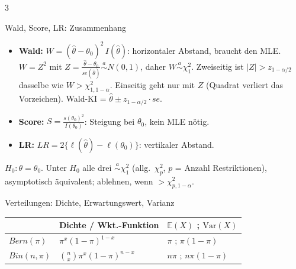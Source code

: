 \documentclass[8pt,a4paper,landscape]{extarticle}
\renewcommand{\arraystretch}{1.12}
\newcommand{\E}{\mathbb{E}}
\newcommand{\V}{\mathrm{Var}}
\newcommand{\asim}{\overset{a}{\sim}}
\begin{document}
\begin{multicols*}{3}
\begin{wissen}{Wald, Score, LR: Zusammenhang}
\begin{center}
\end{center}
\begin{itemize}
\item \textbf{Wald:} $W=(\hat\theta-\theta_0)^2\,I(\hat\theta)$: horizontaler Abstand, braucht den MLE. $W=Z^2$ mit $Z=\frac{\hat\theta-\theta_0}{se(\hat\theta)}\asim N(0,1)$, daher $W\asim\chi^2_1$. Zweiseitig ist $|Z|>z_{1-\alpha/2}$ dasselbe wie $W>\chi^2_{1,1-\alpha}$. Einseitig geht nur mit $Z$ (Quadrat verliert das Vorzeichen). Wald-KI = $\hat\theta\pm z_{1-\alpha/2}\cdot se$.
\item \textbf{Score:} $S=\frac{s(\theta_0)^2}{I(\theta_0)}$: Steigung bei $\theta_0$, kein MLE nötig.
\item \textbf{LR:} $LR=2\big\{\ell(\hat\theta)-\ell(\theta_0)\big\}$: vertikaler Abstand.
\end{itemize}
$H_0:\theta=\theta_0$. Unter $H_0$ alle drei $\asim\chi^2_1$ (allg.\ $\chi^2_p$, $p$ = Anzahl Restriktionen), asymptotisch äquivalent; ablehnen, wenn $>\chi^2_{p,1-\alpha}$.
\end{wissen}
\begin{werkzeug}{Verteilungen: Dichte, Erwartungswert, Varianz}
{\everymath{\displaystyle}\renewcommand{\arraystretch}{1.55}\begin{tabularx}{\linewidth}{@{}>{\raggedright\arraybackslash}p{1.75cm}>{\raggedright\arraybackslash}X>{\raggedright\arraybackslash}p{2.75cm}@{}}
\toprule
 & Dichte / Wkt.-Funktion & $\E(X)$ ; $\V(X)$ \\
\midrule
$Bern(\pi)$ & $\pi^x(1-\pi)^{1-x}$ & $\pi$ ; $\pi(1-\pi)$ \\
$Bin(n,\pi)$ & $\binom nx\pi^x(1-\pi)^{n-x}$ & $n\pi$ ; $n\pi(1-\pi)$ \\

\end{tabularx}}
\end{werkzeug}
\end{multicols*}
\end{document}
